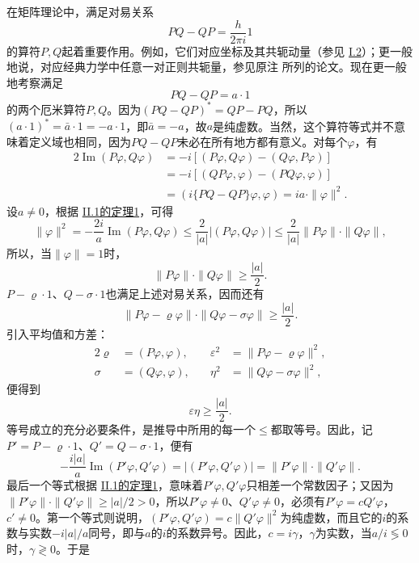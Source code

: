 \documentclass[fontsize=13pt,twoside,openany,headings=normal,parskip=false,bookmarkpackage=false,DIV=calc]{scrbook}
\begin{document}
在矩阵理论中，满足对易关系
\[
PQ-QP=\frac h{2\pi i}1
\]
的算符$P,\allowbreak Q$起着重要作用。例如，它们对应坐标及其共轭动量（参见 \hyperref[sec:I.2]{I.2}）；更一般地说，对应经典力学中任意一对正则共轭量，参见原注 \hyperlink{note-2}{} 所列的论文。现在更一般地考察满足
\[
PQ-QP=a\cdot1
\]
的两个厄米算符$P,\allowbreak Q$。因为$(PQ-QP)^*=QP-PQ$，所以$(a\cdot1)^*=\bar a\cdot1=-a\cdot1$，即$\bar a=-a$，故$a$是纯虚数。当然，这个算符等式并不意味着定义域也相同，因为$PQ-QP$未必在所有地方都有意义。对每个$\varphi$，有
\begin{align*}
2\operatorname{Im}(P\varphi,Q\varphi)
&=-i[(P\varphi,Q\varphi)-(Q\varphi,P\varphi)]\\
&=-i[(QP\varphi,\varphi)-(PQ\varphi,\varphi)]\\
&=(i\{PQ-QP\}\varphi,\varphi)=ia\cdot\|\varphi\|^2.
\end{align*}
设$a\ne0$，根据 \hyperref[thm:II.1]{II.1的定理1}，可得
\[
\|\varphi\|^2=-\frac{2i}a\operatorname{Im}(P\varphi,Q\varphi)
\le\frac2{|a|}|(P\varphi,Q\varphi)|
\le\frac2{|a|}\|P\varphi\|\cdot\|Q\varphi\|,
\]
所以，当$\|\varphi\|=1$时，
\[
\|P\varphi\|\cdot\|Q\varphi\|\ge\frac{|a|}2.
\]
$P-\varrho\cdot1$、$Q-\sigma\cdot1$也满足上述对易关系，因而还有
\[
\|P\varphi-\varrho\varphi\|\cdot\|Q\varphi-\sigma\varphi\|\ge\frac{|a|}2.
\]
引入平均值和方差：
\begin{alignat*}{2}
\varrho&=(P\varphi,\varphi),&\quad \varepsilon^2&=\|P\varphi-\varrho\varphi\|^2,\\
\sigma&=(Q\varphi,\varphi),&\quad \eta^2&=\|Q\varphi-\sigma\varphi\|^2,
\end{alignat*}
便得到
\begin{equation}
\varepsilon\eta\ge\frac{|a|}2.\tag{U}\label{eq:III.4.U}
\end{equation}\hypertarget{origpage-124}{}\label{origpage-124}等号成立的充分必要条件，是推导中所用的每一个$\le$都取等号。因此，记$P'=P-\varrho\cdot1$、$Q'=Q-\sigma\cdot1$，便有
\[
-\frac{i|a|}a\operatorname{Im}(P'\varphi,Q'\varphi)
=|(P'\varphi,Q'\varphi)|=\|P'\varphi\|\cdot\|Q'\varphi\|.
\]
最后一个等式根据 \hyperref[thm:II.1]{II.1的定理1}，意味着$P'\varphi,\allowbreak Q'\varphi$只相差一个常数因子；又因为$\|P'\varphi\|\cdot\|Q'\varphi\|\ge|a|/2>0$，所以$P'\varphi\ne0$、$Q'\varphi\ne0$，必须有$P'\varphi=cQ'\varphi$，$c'\ne0$。第一个等式则说明，$(P'\varphi,\allowbreak Q'\varphi)=c\|Q'\varphi\|^2$为纯虚数，而且它的$i$的系数与实数$-i|a|/a$同号，即与$a$的$i$的系数异号。因此，$c=i\gamma$，$\gamma$为实数，当$a/i\lessgtr0$时，$\gamma\gtrless0$。于是
\end{document}
